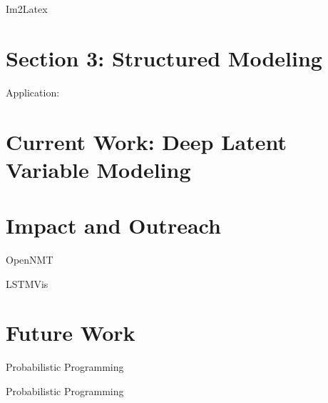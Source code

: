 \documentclass[draft]{beamer}
\begin{document}
\begin{frame}{Im2Latex}
\end{frame}
  

\section{Section 3: Structured Modeling }


\begin{frame}

\end{frame}


\begin{frame}{Application: }

\end{frame}


\section{Current Work: Deep Latent Variable Modeling}


\begin{frame}

\end{frame}

\begin{frame}

\end{frame}

\section{Impact and Outreach}

\begin{frame}{OpenNMT}

\end{frame}

\begin{frame}{LSTMVis}

\end{frame}



\section{Future Work}

\begin{frame}{Probabilistic Programming}

\end{frame}

\begin{frame}{Probabilistic Programming}

\end{frame}


\begin{frame}

\end{frame}



\end{document}
